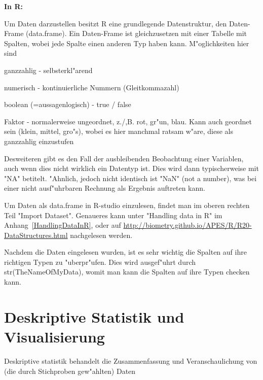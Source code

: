 \documentclass[a4paper,twoside]{tufte-book}\usepackage[]{graphicx}\usepackage[]{color}
\begin{document}
\vspace{1cm}
\begin{fullwidth}
\begin{mdframed}
    
\textbf{In R:} 

Um Daten darzustellen besitzt R eine grundlegende Datenstruktur, den Daten-Frame (data.frame). Ein Daten-Frame ist gleichzusetzen mit einer Tabelle mit Spalten, wobei jede Spalte einen anderen Typ haben kann. M"oglichkeiten hier sind

\begin{itemize*}
  \item ganzzahlig - selbsterkl"arend
  \item numerisch - kontinuierliche Nummern (Gleitkommazahl)
  \item boolean (=aussagenlogisch) - true / false
  \item Faktor - normalerweise ungeordnet, z./,B. rot, gr"un, blau. Kann auch geordnet sein (klein, mittel, gro"s), wobei es hier manchmal ratsam w"are, diese als ganzzahlig einzustufen
\end{itemize*}

Desweiteren gibt es den Fall der ausbleibenden Beobachtung einer Variablen, auch wenn dies nicht wirklich ein Datentyp ist. Dies wird dann typischerweise mit "NA" betitelt. "Ahnlich, jedoch nicht identisch ist "NaN" (not a number), was bei einer nicht ausf"uhrbaren Rechnung als Ergebnis auftreten kann.

Um Daten als data.frame in R-studio einzulesen, findet man im oberen rechten Teil "Import Dataset". Genaueres kann unter "Handling data in R" im Anhang~\ref{HandlingDataInR}, oder auf \href{http://biometry.github.io/APES/R/R20-DataStructures.html}{http://biometry.github.io/APES/R/R20-DataStructures.html} nachgelesen werden.

Nachdem die Daten eingelesen wurden, ist es sehr wichtig die Spalten auf ihre richtigen Typen zu "uberpr"ufen. Dies wird ausgef"uhrt durch str(TheNameOfMyData), womit man kann die Spalten auf ihre Typen checken kann.

\end{mdframed}
\end{fullwidth}


\chapter{Deskriptive Statistik und Visualisierung}

Deskriptive statistik behandelt die Zusammenfassung und Veranschaulichung von (die durch Stichproben gew"ahlten) Daten
\end{document}
